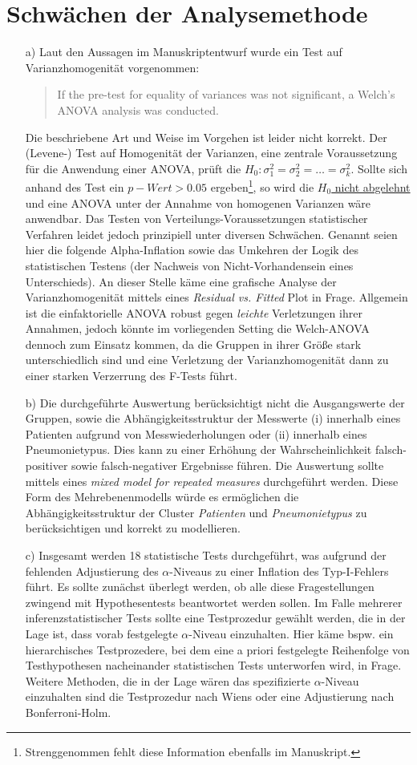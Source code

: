 \documentclass{scrartcl}
\theoremstyle{definition}
\theoremstyle{remark}
\begin{document}
\section{Schwächen der Analysemethode}
\begin{enumerate}
	\item[a) ]Laut den Aussagen im Manuskriptentwurf wurde ein Test auf Varianzhomogenität vorgenommen: 
	\begin{quotation}
		\noindent	If the pre-test for equality of variances was not significant, a Welch's ANOVA analysis was conducted.
	\end{quotation}
	Die beschriebene Art und Weise im Vorgehen ist leider nicht korrekt. Der (Levene-) Test auf Homogenität der Varianzen, eine zentrale Voraussetzung für die Anwendung einer ANOVA, prüft die $H_0: \sigma^{2}_{1} = \sigma^{2}_{2} = \dots = \sigma^{2}_k$. Sollte sich anhand des Test ein $p-Wert>0.05$ ergeben\footnote{Strenggenommen fehlt diese Information ebenfalls im Manuskript.}, so wird die \underline{$H_0$ nicht abgelehnt} und eine ANOVA unter der Annahme von homogenen Varianzen wäre anwendbar. Das Testen von Verteilungs-Voraussetzungen statistischer Verfahren leidet jedoch prinzipiell unter diversen Schwächen. Genannt seien hier die folgende Alpha-Inflation sowie das Umkehren der Logik des statistischen Testens (der Nachweis von Nicht-Vorhandensein eines Unterschieds). An dieser Stelle käme eine grafische Analyse der Varianzhomogenität mittels eines \textit{Residual vs. Fitted} Plot in Frage. Allgemein ist die einfaktorielle ANOVA  robust gegen \textit{leichte} Verletzungen ihrer Annahmen, jedoch könnte im vorliegenden Setting die Welch-ANOVA  dennoch zum Einsatz kommen, da die Gruppen in ihrer Größe stark unterschiedlich sind und eine Verletzung der Varianzhomogenität dann zu einer starken Verzerrung des F-Tests führt.
	\item[b) ] Die durchgeführte Auswertung berücksichtigt nicht die Ausgangswerte der Gruppen, sowie die Abhängigkeitsstruktur der Messwerte (i) innerhalb eines Patienten aufgrund von Messwiederholungen oder (ii) innerhalb eines Pneumonietypus. Dies kann zu einer Erhöhung der Wahrscheinlichkeit falsch-positiver sowie falsch-negativer Ergebnisse führen. Die Auswertung sollte mittels eines  \textit{mixed model for repeated measures} durchgeführt werden. Diese Form des Mehrebenenmodells würde es ermöglichen die Abhängigkeitsstruktur der Cluster \textit{Patienten} und \textit{Pneumonietypus} zu berücksichtigen und korrekt zu modellieren.
	\item[c) ]Insgesamt werden 18 statistische Tests durchgeführt, was aufgrund der fehlenden Adjustierung des $\alpha$-Niveaus zu einer Inflation des Typ-I-Fehlers führt. Es sollte zunächst überlegt werden, ob alle diese Fragestellungen zwingend mit Hypothesentests beantwortet werden sollen. Im Falle mehrerer inferenzstatistischer Tests sollte eine Testprozedur gewählt werden, die in der Lage ist, dass vorab festgelegte $\alpha$-Niveau einzuhalten. Hier käme bspw. ein hierarchisches Testprozedere, bei dem eine a priori festgelegte Reihenfolge von Testhypothesen nacheinander statistischen Tests unterworfen wird, in Frage. Weitere Methoden, die in der Lage wären das spezifizierte $\alpha$-Niveau einzuhalten sind die Testprozedur nach Wiens oder eine Adjustierung nach Bonferroni-Holm.

\end{enumerate}
\end{document}
